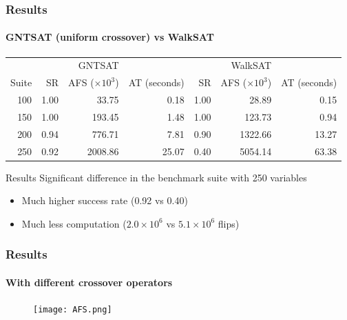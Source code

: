 \begin{frame}
\frametitle{Results}
\framesubtitle{GNTSAT (uniform crossover) vs WalkSAT}
\begin{tabular}{r | r r r | r r r}
	\hline
	      &      & GNTSAT                     &                     &      & WalkSAT                    &                     \\
	Suite & SR   & AFS \tiny{($\times 10^3$)} & AT \tiny{(seconds)} & SR   & AFS \tiny{($\times 10^3$)} & AT \tiny{(seconds)} \\
	\hline
	100   & 1.00 & 33.75                      & 0.18                & 1.00 & 28.89                      & 0.15                \\
	150   & 1.00 & 193.45                     & 1.48                & 1.00 & 123.73                     & 0.94                \\
	200   & 0.94 & 776.71                     & 7.81                & 0.90 & 1322.66                    & 13.27               \\
	250   & 0.92 & 2008.86                    & 25.07               & 0.40 & 5054.14                    & 63.38
\end{tabular}

\begin{alertblock}{Results}
	Significant difference in the benchmark suite with 250
	variables
	\begin{itemize}
		\item Much higher success rate (0.92 vs 0.40)
		\item Much less computation ($2.0 \times 10^6$ vs $5.1 \times 10^6$ flips)
	\end{itemize}
\end{alertblock}
\end{frame}

\begin{frame}
\frametitle{Results}
\framesubtitle{With different crossover operators}
\begin{figure}[htpb]
	\centering
	\texttt{[image: AFS.png]}
\end{figure}
\end{frame}

